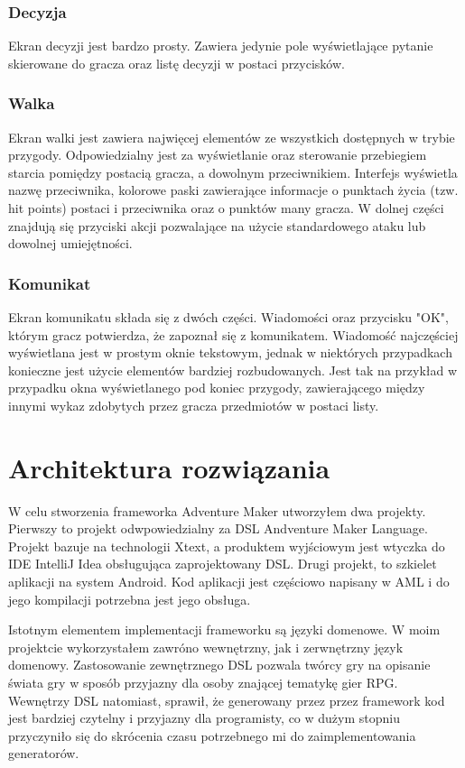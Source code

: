 \documentclass	{xmgr}
\begin{document}
\subsection*{Decyzja}
Ekran decyzji jest bardzo prosty. Zawiera jedynie pole wyświetlające pytanie skierowane do gracza oraz listę decyzji w postaci przycisków.
\subsection*{Walka}
Ekran walki jest zawiera najwięcej elementów ze wszystkich dostępnych w trybie przygody. Odpowiedzialny jest za wyświetlanie oraz sterowanie przebiegiem starcia pomiędzy postacią gracza, a dowolnym przeciwnikiem. Interfejs wyświetla nazwę przeciwnika, kolorowe paski zawierające informacje o punktach życia (tzw. hit points) postaci i przeciwnika oraz o punktów many gracza. W dolnej części znajdują się przyciski akcji pozwalające na użycie standardowego ataku lub dowolnej umiejętności.
\subsection*{Komunikat}
Ekran komunikatu składa się z dwóch części. Wiadomości oraz przycisku "OK", którym gracz potwierdza, że zapoznał się z komunikatem. Wiadomość najczęściej wyświetlana jest w prostym oknie tekstowym, jednak w niektórych przypadkach konieczne jest użycie elementów bardziej rozbudowanych. Jest tak na przykład w przypadku okna wyświetlanego pod koniec przygody, zawierającego między innymi wykaz zdobytych przez gracza przedmiotów w postaci listy.
\chapter{Architektura rozwiązania}
W celu stworzenia frameworka Adventure Maker utworzyłem dwa projekty. Pierwszy to projekt odwpowiedzialny za DSL Andventure Maker Language. Projekt bazuje na technologii Xtext, a produktem wyjściowym jest wtyczka do IDE IntelliJ Idea obsługująca zaprojektowany DSL.
Drugi projekt, to szkielet aplikacji na system Android. Kod aplikacji jest częściowo napisany w AML i do jego kompilacji potrzebna jest jego obsługa.

Istotnym elementem implementacji frameworku są języki domenowe. W moim projektcie wykorzystałem zawróno wewnętrzny, jak i zerwnętrzny język domenowy. Zastosowanie zewnętrznego DSL pozwala twórcy gry na opisanie świata gry w sposób przyjazny dla osoby znającej tematykę gier RPG. Wewnętrzy DSL natomiast, sprawił, że generowany przez przez framework kod jest bardziej czytelny i przyjazny dla programisty, co w dużym stopniu przyczyniło się do skrócenia czasu potrzebnego mi do zaimplementowania generatorów.
\end{document}
